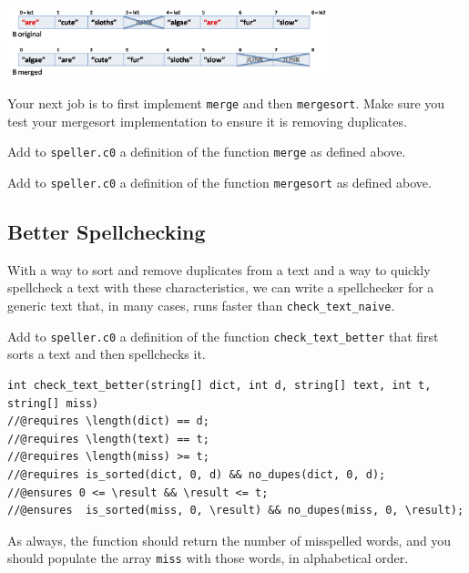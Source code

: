 \documentclass[12pt]{exam}
\begin{document}
\begin{center}
\includegraphics[width=0.7\textwidth]{img/merge.png}
\end{center}

Your next job is to first implement \lstinline'merge' and then
\lstinline'mergesort'. Make sure you test your mergesort
implementation to ensure it is removing duplicates.

\begin{task}[5]
Add to \lstinline'speller.c0' a definition of the function
\lstinline'merge' as defined above.
\end{task}

\begin{task}[3]
Add to \lstinline'speller.c0' a definition of the function
\lstinline'mergesort' as defined above.
\end{task}


\subsection{Better Spellchecking}

With a way to sort and remove duplicates from a text and a way to
quickly spellcheck a text with these characteristics, we can write a
spellchecker for a generic text that, in many cases, runs faster than
\lstinline'check_text_naive'.

\begin{task}[2]
Add to \lstinline'speller.c0' a definition of the function
\lstinline'check_text_better' that first sorts a text and then
spellchecks it.
\begin{lstlisting}[basicstyle=\smallbasicstyle]
int check_text_better(string[] dict, int d, string[] text, int t, string[] miss)
//@requires \length(dict) == d;
//@requires \length(text) == t;
//@requires \length(miss) >= t;
//@requires is_sorted(dict, 0, d) && no_dupes(dict, 0, d);
//@ensures 0 <= \result && \result <= t;
//@ensures  is_sorted(miss, 0, \result) && no_dupes(miss, 0, \result);
\end{lstlisting}
As always, the function should return the number of misspelled words,
and you should populate the array \lstinline'miss' with those words,
in alphabetical order.
\end{task}
\end{document}
